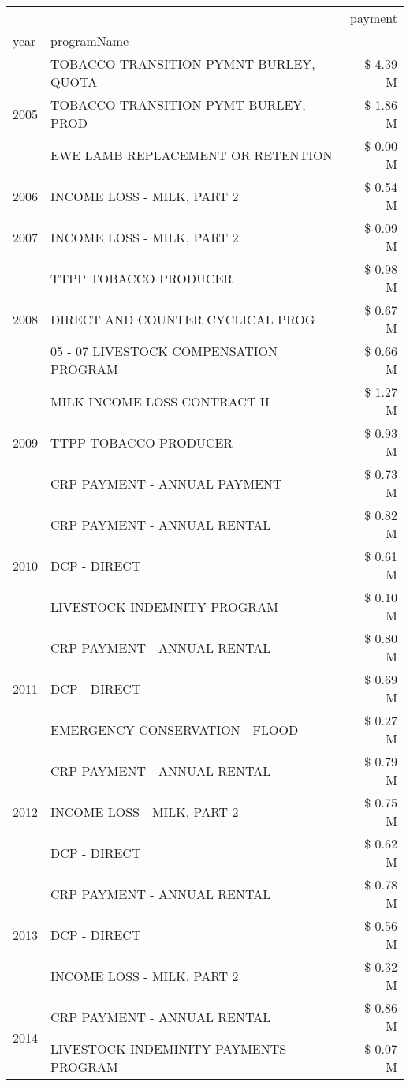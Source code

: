 \begin{tabular}{llr}
\toprule
 &  & payment \\
year & programName &  \\
\midrule
\multirow[t]{3}{*}{2005} & TOBACCO TRANSITION PYMNT-BURLEY, QUOTA & \$ 4.39 M \\
 & TOBACCO TRANSITION PYMT-BURLEY, PROD & \$ 1.86 M \\
 & EWE LAMB REPLACEMENT OR RETENTION & \$ 0.00 M \\
\cline{1-3}
2006 & INCOME LOSS - MILK, PART 2 & \$ 0.54 M \\
\cline{1-3}
2007 & INCOME LOSS - MILK, PART 2 & \$ 0.09 M \\
\cline{1-3}
\multirow[t]{3}{*}{2008} & TTPP TOBACCO PRODUCER & \$ 0.98 M \\
 & DIRECT AND COUNTER CYCLICAL PROG & \$ 0.67 M \\
 & 05 - 07 LIVESTOCK COMPENSATION PROGRAM & \$ 0.66 M \\
\cline{1-3}
\multirow[t]{3}{*}{2009} & MILK INCOME LOSS CONTRACT II & \$ 1.27 M \\
 & TTPP TOBACCO PRODUCER & \$ 0.93 M \\
 & CRP PAYMENT - ANNUAL PAYMENT & \$ 0.73 M \\
\cline{1-3}
\multirow[t]{3}{*}{2010} & CRP PAYMENT - ANNUAL RENTAL & \$ 0.82 M \\
 & DCP - DIRECT & \$ 0.61 M \\
 & LIVESTOCK INDEMNITY PROGRAM & \$ 0.10 M \\
\cline{1-3}
\multirow[t]{3}{*}{2011} & CRP PAYMENT - ANNUAL RENTAL & \$ 0.80 M \\
 & DCP - DIRECT & \$ 0.69 M \\
 & EMERGENCY CONSERVATION - FLOOD & \$ 0.27 M \\
\cline{1-3}
\multirow[t]{3}{*}{2012} & CRP PAYMENT - ANNUAL RENTAL & \$ 0.79 M \\
 & INCOME LOSS - MILK, PART 2 & \$ 0.75 M \\
 & DCP - DIRECT & \$ 0.62 M \\
\cline{1-3}
\multirow[t]{3}{*}{2013} & CRP PAYMENT - ANNUAL RENTAL & \$ 0.78 M \\
 & DCP - DIRECT & \$ 0.56 M \\
 & INCOME LOSS - MILK, PART 2 & \$ 0.32 M \\
\cline{1-3}
\multirow[t]{3}{*}{2014} & CRP PAYMENT - ANNUAL RENTAL & \$ 0.86 M \\
 & LIVESTOCK INDEMINITY PAYMENTS PROGRAM & \$ 0.07 M \\

\end{tabular}

